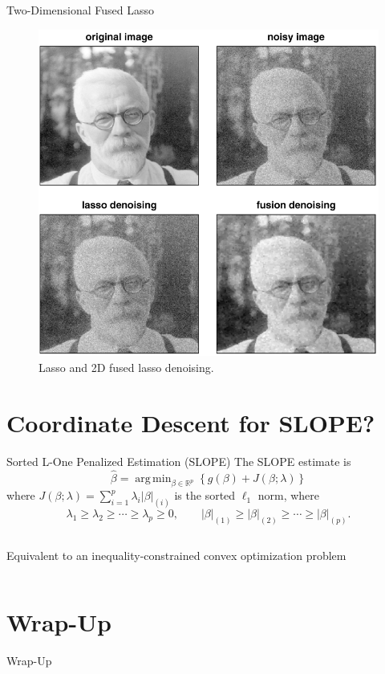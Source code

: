 \documentclass[10pt,ignorenonframetext]{beamer}
\newif\ifbibliography
\DeclareMathOperator*{\argmin}{arg\,min}
\begin{document}
\begin{frame}{Two-Dimensional Fused Lasso}

\begin{figure}
    \centering
    \includegraphics[width=0.8\linewidth]{figures/fisher-fused.png}
    \caption{Lasso and 2D fused lasso denoising.}
\end{figure}
\end{frame}

\section{Coordinate Descent for SLOPE?}

\begin{frame}{Sorted L-One Penalized Estimation (SLOPE)}
    The SLOPE estimate is 
    \[
    \hat\beta = \argmin_{\beta \in \mathbb{R}^p}\left\{ g(\beta) + J(\beta;\lambda) \right\}
    \]
    where \(J(\beta;\lambda)=\sum_{i=1}^p\lambda_i \lvert \beta \rvert_{(i)}\) is the \alert{sorted \(\ell_1\) norm},
    where
    \[
        \lambda_1 \geq \lambda_2 \geq \cdots \geq \lambda_p \geq 0, \qquad 
        \lvert \beta \rvert_{(1)} \geq \lvert \beta \rvert_{(2)} \geq \cdots \geq \lvert \beta \rvert_{(p)}.
    \]
    \medskip
    \begin{columns}[c]
        \begin{column}{0.45\textwidth}
            Equivalent to an inequality-constrained convex 
            optimization problem
        \end{column}
        \begin{column}{0.45\textwidth}
            \pgfplotsset{width=6cm,height=6cm}
               
        \end{column}
    \end{columns}
\end{frame}

\section{Wrap-Up}

\begin{frame}{Wrap-Up}
    
\end{frame}

\end{document}
